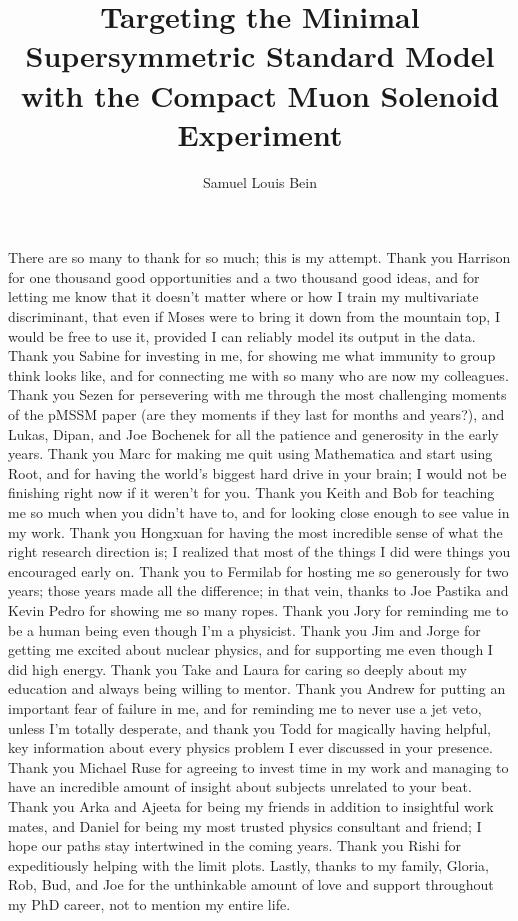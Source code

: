 \documentclass[12pt,expanded,copyright]{fsuthesis}
\title{Targeting the Minimal Supersymmetric Standard Model with the Compact Muon Solenoid Experiment}
\author{Samuel Louis Bein}
\begin{document}
\frontmatter
\maketitle
\makecommitteepage


\begin{acknowledgments}
There are so many to thank for so much; this is my attempt. Thank you Harrison for one thousand good opportunities and a two thousand good ideas, and for letting me know that it doesn't matter where or how I train my multivariate discriminant, that even if Moses were to bring it down from the mountain top, I would be free to use it, provided I can reliably model its output in the data. Thank you Sabine for investing in me, for showing me what immunity to group think looks like, and for connecting me with so many who are now my colleagues. Thank you Sezen for persevering with me through the most challenging moments of the pMSSM paper (are they moments if they last for months and years?), and Lukas, Dipan, and Joe Bochenek for all the patience and generosity in the early years. Thank you Marc for making me quit using Mathematica and start using Root, and for having the world's biggest hard drive in your brain; I would not be finishing right now if it weren't for you. Thank you Keith and Bob for teaching me so much when you didn't have to, and for looking close enough to see value in my work. Thank you Hongxuan for having the most incredible sense of what the right research direction is; I realized that most of the things I did were things you encouraged early on. Thank you to Fermilab for hosting me so generously for two years; those years made all the difference; in that vein, thanks to Joe Pastika and Kevin Pedro for showing me so many ropes. Thank you Jory for reminding me to be a human being even though I'm a physicist. Thank you Jim and Jorge for getting me excited about nuclear physics, and for supporting me even though I did high energy. Thank you Take and Laura for caring so deeply about my education and always being willing to mentor. Thank you Andrew for putting an important fear of failure in me, and for reminding me to never use a jet veto, unless I'm totally desperate, and thank you Todd for magically having helpful, key information about every physics problem I ever discussed in your presence. Thank you Michael Ruse for agreeing to invest time in my work and managing to have an incredible amount of insight about subjects unrelated to your beat. Thank you Arka and Ajeeta for being my friends in addition to insightful work mates, and Daniel for being my most trusted physics consultant and friend; I hope our paths stay intertwined in the coming years. Thank you Rishi for expeditiously helping with the limit plots. Lastly, thanks to my family, Gloria, Rob, Bud, and Joe for the unthinkable amount of love and support throughout my PhD career, not to mention my entire life. 
\end{acknowledgments}
\end{document}
